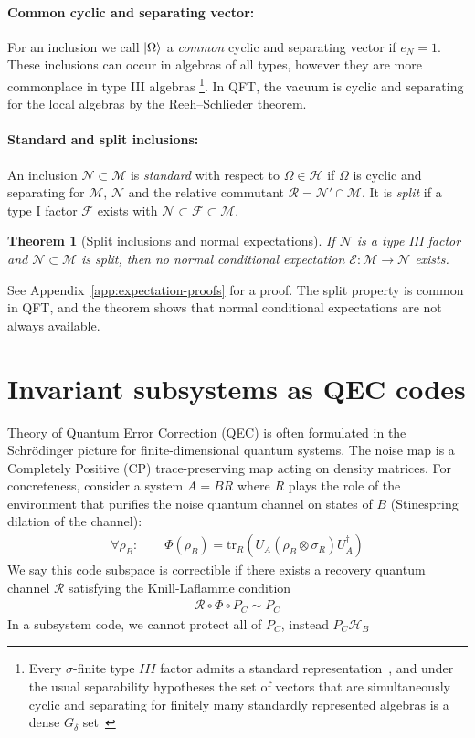 \documentclass[a4paper,11pt]{article}
\newtheorem{theorem}{Theorem}
\theoremstyle{definition}
\newcommand{\mR}{\mathcal{R}}
\newcommand{\mN}{\mathcal{N}}
\newcommand{\mH}{\mathcal{H}}
\newcommand{\mM}{\mathcal{M}}
\newcommand{\mE}{\mathcal{E}}
\begin{document}
\paragraph{Common cyclic and separating vector:} For an inclusion we
call $\ket{\Omega}$ a \emph{common} cyclic and separating vector if $e_N=1$. These inclusions can occur in algebras of all types, however they are more commonplace in type III algebras \footnote{Every $\sigma$-finite type $III$ factor admits a standard representation~\cite{Blackadar2006}, and under the usual separability hypotheses the set of vectors that are simultaneously cyclic and separating for finitely many standardly represented algebras is a dense $G_\delta$ set~\cite{dixmiermarechal}}. In QFT, the vacuum is cyclic and separating for the local algebras by the Reeh--Schlieder theorem.

\paragraph{Standard and split inclusions:}
An inclusion $\mN\subset\mM$ is
\emph{standard} with respect to $\Omega\in\mathcal H$ if $\Omega$ is cyclic
and separating for $\mM$, $\mN$ and the relative commutant $\mR=\mN'\cap \mM$. It is \emph{split} if a type I factor $\mathcal F$ exists with
$\mN\subset\mathcal F\subset\mM$.

\begin{theorem}[Split inclusions and normal expectations]\label{thm:split-no-expectation}
If $\mN$ is a type III factor and
$\mN\subset\mM$ is split, then no normal conditional expectation
$\mE:\mM\to\mN$ exists.
\end{theorem}
See Appendix~\ref{app:expectation-proofs} for a proof. The split property is common in QFT, and the theorem shows that normal conditional expectations are not always available.


\section{Invariant subsystems as QEC codes}\label{sec:QEC}

Theory of Quantum Error Correction (QEC) is often formulated in the Schrödinger picture for finite-dimensional quantum systems. The noise map is a Completely Positive (CP) trace-preserving map acting on density matrices. For concreteness, consider a system $A=BR$ where $R$ plays the role of the environment that purifies the noise quantum channel on states of $B$ (Stinespring dilation of the channel):
\begin{align}
    \forall \rho_B:\qquad \Phi(\rho_B)=\text{tr}_R(U_A (\rho_B\otimes \sigma_R)U_A^\dagger)
\end{align}
We say this code subspace is correctible if there exists a recovery quantum channel $\mR$ satisfying the Knill-Laflamme condition
\begin{align}
    \mR\circ \Phi\circ P_C\sim P_C
\end{align}
In a subsystem code, we cannot protect all of $P_C$, instead $P_C\mH_B$ 
\end{document}
